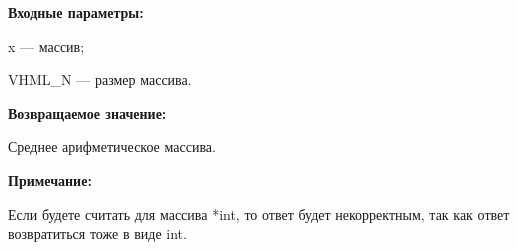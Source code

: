 \textbf{Входные параметры:}

 x --- массив;
 
 VHML\_N --- размер массива.

\textbf{Возвращаемое значение:}

 Среднее арифметическое массива.
 
\textbf{Примечание:}

Если будете считать для массива *int, то ответ будет некорректным, так как ответ возвратиться тоже в виде int.
 
